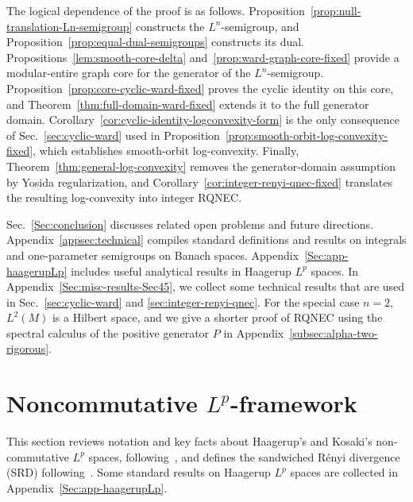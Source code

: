 \documentclass[11pt,a4paper]{article}
\theoremstyle{plain}
\numberwithin{theorem}{section}
\theoremstyle{definition}
\newcommand{\?}{\overset{?}{=}}
\begin{document}
The logical dependence of the proof is as follows. Proposition~\ref{prop:null-translation-Ln-semigroup} constructs the $L^n$-semigroup, and Proposition~\ref{prop:equal-dual-semigroups} constructs its dual. 
Propositions~\ref{lem:smooth-core-delta} and~\ref{prop:ward-graph-core-fixed} provide a modular-entire graph core for the generator of the $L^n$-semigroup.
Proposition~\ref{prop:core-cyclic-ward-fixed} proves the cyclic identity on this core, and Theorem~\ref{thm:full-domain-ward-fixed} extends it to the full generator domain. 
Corollary~\ref{cor:cyclic-identity-logconvexity-form} is the only consequence of Sec.~\ref{sec:cyclic-ward} used in Proposition~\ref{prop:smooth-orbit-log-convexity-fixed}, which establishes smooth-orbit log-convexity. 
Finally, Theorem~\ref{thm:general-log-convexity} removes the generator-domain assumption by Yosida regularization, and Corollary~\ref{cor:integer-renyi-qnec-fixed} translates the resulting log-convexity into integer RQNEC.

Sec.~\ref{Sec:conclusion} discusses related open problems and future directions.  Appendix~\ref{appsec:technical} compiles standard definitions and results on integrals and one-parameter semigroups on Banach spaces. Appendix~\ref{Sec:app-haagerupLp} includes useful analytical results in Haagerup $L^p$ spaces. In Appendix~\ref{Sec:misc-results-Sec45}, we collect some technical results that are used in Sec.~\ref{sec:cyclic-ward} and \ref{sec:integer-renyi-qnec}. For the special case \(n=2\), \(L^2(M)\) is a Hilbert space, and we give a shorter proof of RQNEC using the spectral calculus of the positive generator
\(P\) in Appendix~\ref{subsec:alpha-two-rigorous}.



\section{Noncommutative \texorpdfstring{$L^p$}{Lp}-framework}
\label{Sec:prelim}

This section reviews notation and key facts about Haagerup's and Kosaki's non-commutative $L^p$ spaces, following~\cite{Terp:1981lp,Hiai:2021qfv,Hiai:2021cks}, and defines the sandwiched R\'enyi divergence (SRD) following~\cite{Jencova:2017txf, Jencova:2016tqz}. 
Some standard results on Haagerup $L^p$ spaces are collected in Appendix~\ref{Sec:app-haagerupLp}.

 

\end{document}
